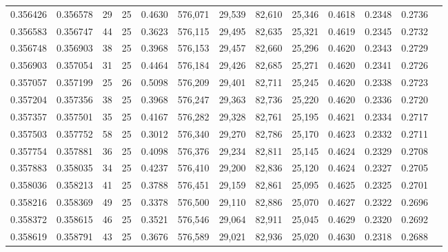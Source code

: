 \begin{tabular}{rrrrrrrrrrrrr}
0.356426 & 0.356578 &    29 &  25 &                                     0.4630 & 576,071 &  29,539 &  82,610 &  25,346 & 0.4618 & 0.2348 & 0.2736 \\
0.356583 & 0.356747 &    44 &  25 &                                     0.3623 & 576,115 &  29,495 &  82,635 &  25,321 & 0.4619 & 0.2345 & 0.2732 \\
0.356748 & 0.356903 &    38 &  25 &                                     0.3968 & 576,153 &  29,457 &  82,660 &  25,296 & 0.4620 & 0.2343 & 0.2729 \\
0.356903 & 0.357054 &    31 &  25 &                                     0.4464 & 576,184 &  29,426 &  82,685 &  25,271 & 0.4620 & 0.2341 & 0.2726 \\
0.357057 & 0.357199 &    25 &  26 &                                     0.5098 & 576,209 &  29,401 &  82,711 &  25,245 & 0.4620 & 0.2338 & 0.2723 \\
0.357204 & 0.357356 &    38 &  25 &                                     0.3968 & 576,247 &  29,363 &  82,736 &  25,220 & 0.4620 & 0.2336 & 0.2720 \\
0.357357 & 0.357501 &    35 &  25 &                                     0.4167 & 576,282 &  29,328 &  82,761 &  25,195 & 0.4621 & 0.2334 & 0.2717 \\
0.357503 & 0.357752 &    58 &  25 &                                     0.3012 & 576,340 &  29,270 &  82,786 &  25,170 & 0.4623 & 0.2332 & 0.2711 \\
0.357754 & 0.357881 &    36 &  25 &                                     0.4098 & 576,376 &  29,234 &  82,811 &  25,145 & 0.4624 & 0.2329 & 0.2708 \\
0.357883 & 0.358035 &    34 &  25 &                                     0.4237 & 576,410 &  29,200 &  82,836 &  25,120 & 0.4624 & 0.2327 & 0.2705 \\
0.358036 & 0.358213 &    41 &  25 &                                     0.3788 & 576,451 &  29,159 &  82,861 &  25,095 & 0.4625 & 0.2325 & 0.2701 \\
0.358216 & 0.358369 &    49 &  25 &                                     0.3378 & 576,500 &  29,110 &  82,886 &  25,070 & 0.4627 & 0.2322 & 0.2696 \\
0.358372 & 0.358615 &    46 &  25 &                                     0.3521 & 576,546 &  29,064 &  82,911 &  25,045 & 0.4629 & 0.2320 & 0.2692 \\
0.358619 & 0.358791 &    43 &  25 &                                     0.3676 & 576,589 &  29,021 &  82,936 &  25,020 & 0.4630 & 0.2318 & 0.2688 \\

\end{tabular}
